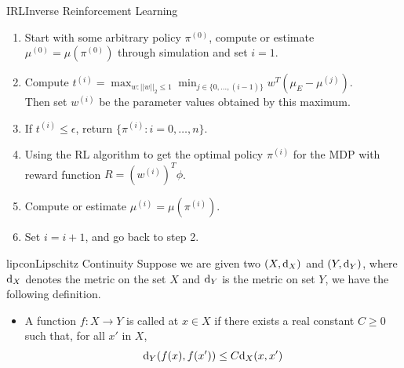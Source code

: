 \documentclass[9pt]{article}
\begin{document}
\begin{topic}{IRL}{Inverse Reinforcement Learning}
 \begin{enumerate}
 \item Start with some arbitrary policy $\pi^{(0)}$, compute or estimate $\mu^{(0)} = \mu(\pi^{(0)})$ through simulation and set $i=1$.
 \item Compute $t^{(i)} = \max_{w:||w||_2\le1}\min_{j\in\{0,\ldots,(i-1)\}}w^T(\mu_E-\mu^{(j)})$.\\
 Then set $w^{(i)}$ be the parameter values obtained by this maximum.
 \item If $t^{(i)} \le \epsilon$, return $\{\pi^{(i)}:i=0,\ldots,n\}$.
 \item Using the RL algorithm to get the optimal policy $\pi^{(i)}$ for the MDP with reward function $R = (w^{(i)})^T\phi$.
 \item Compute or estimate $\mu^{(i)} = \mu(\pi^{(i)})$.
 \item Set $i=i+1$, and go back to step 2.
 \end{enumerate}
 \citep{Abbeel2004Apprenticeship}
\citep{Ziebart2008Maximum}
\citep{Syed2007Game}
\citep{Finn2016Guided}
\citep{Levine2011Nonlinear}

\end{topic}

\begin{topic}{lipcon}{Lipschitz Continuity}
Suppose we are given two  $(X,\mathrm{d}_X)$ and $(Y,\mathrm{d}_Y)$, where $\mathrm{d}_X$ denotes the metric on the set $X$ and $\mathrm{d}_Y$ is the metric on set $Y$, we have the following definition.
\begin{itemize}
\item A function $f:X\rightarrow Y$ is called  at $x\in X$ if there exists a real constant $C\geq 0$ such that, for all $x'$ in $X$,
\[
\mathrm{d}_Y(f(x), f(x')) \le C \mathrm{d}_X(x, x')
\]
\end{itemize}
\citep{Eriksson2013Applied}
\end{topic}
\end{document}
